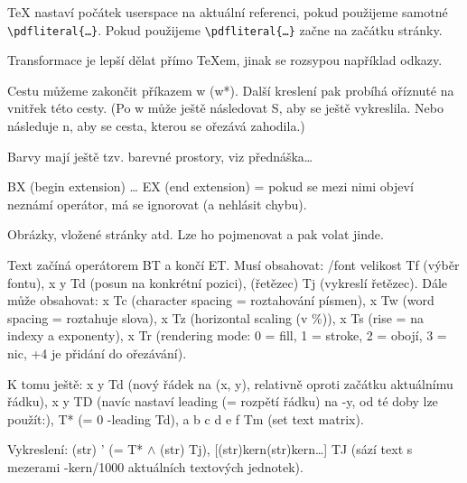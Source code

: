 \documentclass[12pt]{article}					%
\begin{document}
        \begin{poznamka}[TeX]
            TeX nastaví počátek userspace na aktuální referenci, pokud použijeme samotné \verb|\pdfliteral{…}|. Pokud použijeme \verb|\pdfliteral{…}| začne na začátku stránky.
        \end{poznamka}

        \begin{upozorneni}
            Transformace je lepší dělat přímo TeXem, jinak se rozsypou například odkazy.
        \end{upozorneni}


        \begin{definice}
            Cestu můžeme zakončit příkazem w (w*). Další kreslení pak probíhá oříznuté na vnitřek této cesty. (Po w může ještě následovat S, aby se ještě vykreslila. Nebo následuje n, aby se cesta, kterou se ořezává zahodila.)

            Barvy mají ještě tzv. barevné prostory, viz přednáška…

            BX (begin extension) … EX (end extension) = pokud se mezi nimi objeví neznámí operátor, má se ignorovat (a nehlásit chybu).
        \end{definice}

        \begin{definice}[XObject]
            Obrázky, vložené stránky atd. Lze ho pojmenovat a pak volat jinde.
        \end{definice}

        \begin{definice}[Text]
            Text začíná operátorem BT a končí ET. Musí obsahovat: /font velikost Tf (výběr fontu), x y Td (posun na konkrétní pozici), (řetězec) Tj (vykreslí řetězec). Dále může obsahovat: x Tc (character spacing = roztahování písmen), x Tw (word spacing = roztahuje slova), x Tz (horizontal scaling (v \%)), x Ts (rise = na indexy a exponenty), x Tr (rendering mode: 0 = fill, 1 = stroke, 2 = obojí, 3 = nic, +4 je přidání do ořezávání).

            K tomu ještě: x y Td (nový řádek na (x, y), relativně oproti začátku aktuálnímu řádku), x y TD (navíc nastaví leading (= rozpětí řádku) na -y, od té doby lze použít:), T* (= 0 -leading Td), a b c d e f Tm (set text matrix).

            Vykreslení: (str) ' (= T* $\land$ (str) Tj), [(str)kern(str)kern…] TJ (sází text s mezerami -kern/1000 aktuálních textových jednotek).
        \end{definice}
\end{document}
